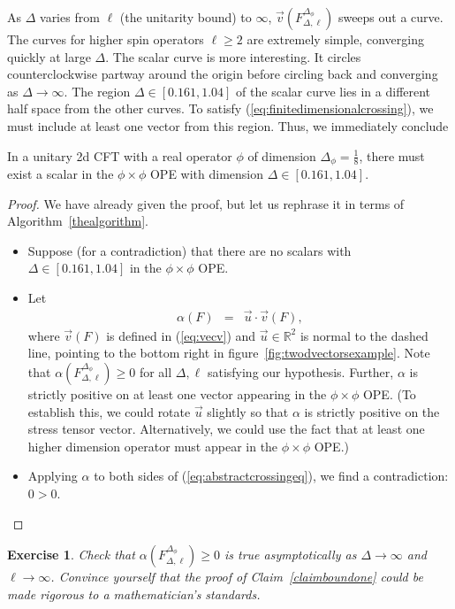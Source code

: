 \documentclass[11pt]{ws-rv9x6}
\newcommand\be{\begin{eqnarray}}
\newcommand\ee{\end{eqnarray}}
\newcommand\f\phi
\newcommand\<\langle
\renewcommand\>\rangle
\newcommand\R{\mathbb{R}}
\renewcommand\.{\cdot}
\newcommand\x\times
\newcommand\De{\Delta}
\newcommand\oo\infty
\newtheorem{exercise}{Exercise}[section]
\begin{document}
As $\De$ varies from $\ell$ (the unitarity bound) to $\oo$, $\vec v(F_{\De,\ell}^{\De_\f})$ sweeps out a curve.  The curves for higher spin operators $\ell\geq 2$ are extremely simple, converging quickly at large $\De$.  The scalar curve is more interesting. It circles counterclockwise partway around the origin before circling back and converging as $\De\to \oo$.  The region $\De\in[0.161,1.04]$ of the scalar curve lies in a different half space from the other curves.  To satisfy (\ref{eq:finitedimensionalcrossing}), we must include at least one vector from this region.  Thus, we immediately conclude
\begin{claim}
In a unitary 2d CFT with a real operator $\f$ of dimension $\De_\f=\frac 1 8$, there must exist a scalar in the $\f\x\f$ OPE with dimension $\De\in[0.161,1.04]$.
\label{claimboundone}
\end{claim}
\begin{proof}
We have already given the proof, but let us rephrase it in terms of Algorithm~\ref{thealgorithm}.
\begin{itemize}
\item Suppose (for a contradiction) that there are no scalars with $\De\in[0.161,1.04]$ in the $\f\x\f$ OPE.
\item Let
\be
\alpha(F) &=& \vec u \. \vec v(F),
\ee
where $\vec v(F)$ is defined in (\ref{eq:vecv}) and $\vec u\in \R^2$ is normal to the dashed line, pointing to the bottom right in figure~\ref{fig:twodvectorsexample}.  Note that $\alpha(F_{\De,\ell}^{\De_\f})\geq 0$ for all $\De,\ell$ satisfying our hypothesis.  Further, $\alpha$ is strictly positive on at least one vector appearing in the $\f\x\f$ OPE. (To establish this, we could rotate $\vec u$ slightly so that $\alpha$ is strictly positive on the stress tensor vector. Alternatively, we could use the fact that at least one higher dimension operator must appear in the $\f\x\f$ OPE.)
\item Applying $\alpha$ to both sides of (\ref{eq:abstractcrossingeq}), we find a contradiction: $0>0$.
\end{itemize}
\end{proof}

\begin{exercise}
\label{exercise:asymptotics}
Check that $\alpha(F_{\De,\ell}^{\De_\f})\geq 0$ is true asymptotically as $\De\to \oo$ and $\ell\to \oo$.  Convince yourself that the proof of Claim~\ref{claimboundone} could be made rigorous to a mathematician's standards.
\end{exercise}
\end{document}
